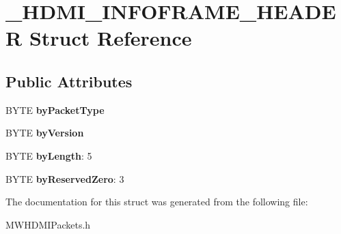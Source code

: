 \hypertarget{struct__HDMI__INFOFRAME__HEADER}{\section{\-\_\-\-H\-D\-M\-I\-\_\-\-I\-N\-F\-O\-F\-R\-A\-M\-E\-\_\-\-H\-E\-A\-D\-E\-R Struct Reference}
\label{struct__HDMI__INFOFRAME__HEADER}
}
\subsection*{Public Attributes}
\begin{DoxyCompactItemize}
\item 
\hypertarget{struct__HDMI__INFOFRAME__HEADER_af8d46a5d5fbb98a6065060d935f049a7}{B\-Y\-T\-E {\bfseries by\-Packet\-Type}}\label{struct__HDMI__INFOFRAME__HEADER_af8d46a5d5fbb98a6065060d935f049a7}

\item 
\hypertarget{struct__HDMI__INFOFRAME__HEADER_a5c0031b3f26d8377c1dedfe3a8c77c87}{B\-Y\-T\-E {\bfseries by\-Version}}\label{struct__HDMI__INFOFRAME__HEADER_a5c0031b3f26d8377c1dedfe3a8c77c87}

\item 
\hypertarget{struct__HDMI__INFOFRAME__HEADER_a3c3f938781406f76746a51adaf7cfaf6}{B\-Y\-T\-E {\bfseries by\-Length}\-: 5}\label{struct__HDMI__INFOFRAME__HEADER_a3c3f938781406f76746a51adaf7cfaf6}

\item 
\hypertarget{struct__HDMI__INFOFRAME__HEADER_a8c9e2e2b15ecaca960e62a4ef77841f3}{B\-Y\-T\-E {\bfseries by\-Reserved\-Zero}\-: 3}\label{struct__HDMI__INFOFRAME__HEADER_a8c9e2e2b15ecaca960e62a4ef77841f3}

\end{DoxyCompactItemize}


The documentation for this struct was generated from the following file\-:\begin{DoxyCompactItemize}
\item 
M\-W\-H\-D\-M\-I\-Packets.\-h\end{DoxyCompactItemize}
